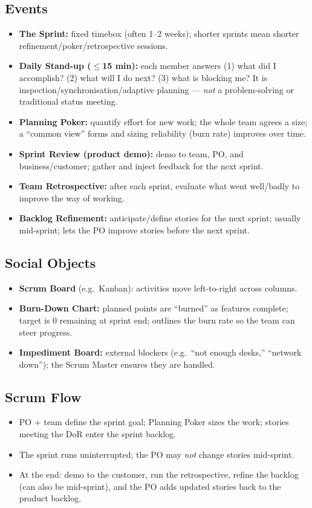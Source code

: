 \documentclass[hidelinks]{article}
\begin{document}
\subsection{Events}
\begin{itemize}
  \item \textbf{The Sprint:} fixed timebox (often 1--2 weeks); shorter sprints mean shorter
        refinement/poker/retrospective sessions.
  \item \textbf{Daily Stand-up ($\le$15 min):} each member answers (1) what did I accomplish?
        (2) what will I do next? (3) what is blocking me? It is inspection/synchronisation/adaptive
        planning --- \emph{not} a problem-solving or traditional status meeting.
  \item \textbf{Planning Poker:} quantify effort for new work; the whole team agrees a size; a
        ``common view'' forms and sizing reliability (burn rate) improves over time.
  \item \textbf{Sprint Review (product demo):} demo to team, PO, and business/customer; gather and
        inject feedback for the next sprint.
  \item \textbf{Team Retrospective:} after each sprint, evaluate what went well/badly to improve
        the way of working.
  \item \textbf{Backlog Refinement:} anticipate/define stories for the next sprint; usually
        mid-sprint; lets the PO improve stories before the next sprint.
\end{itemize}

\subsection{Social Objects}
\begin{itemize}
  \item \textbf{Scrum Board} (e.g.\ Kanban): activities move left-to-right across columns.
  \item \textbf{Burn-Down Chart:} planned points are ``burned'' as features complete; target is 0
        remaining at sprint end; outlines the burn rate so the team can steer progress.
  \item \textbf{Impediment Board:} external blockers (e.g.\ ``not enough desks,'' ``network down'');
        the Scrum Master ensures they are handled.
\end{itemize}

\subsection{Scrum Flow}
\begin{itemize}
  \item PO + team define the sprint goal; Planning Poker sizes the work; stories meeting the DoR
        enter the sprint backlog.
  \item The sprint runs uninterrupted; the PO may \emph{not} change stories mid-sprint.
  \item At the end: demo to the customer, run the retrospective, refine the backlog (can also be
        mid-sprint), and the PO adds updated stories back to the product backlog.
\end{itemize}
\end{document}
